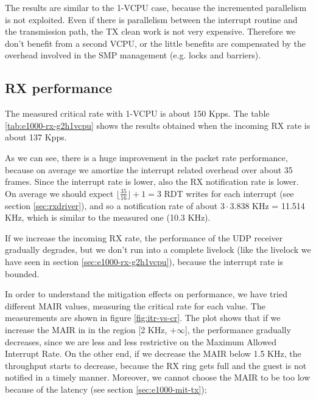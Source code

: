The results are similar to the 1-VCPU case, because the incremented parallelism is not exploited. Even if there is parallelism
between the interrupt routine and the transmission path, the TX clean work is not very expensive. Therefore we don't benefit from a second 
VCPU, or the little benefits are compensated by the overhead involved in the SMP management (e.g. locks and barriers).


\subsection{RX performance}
The measured critical rate with 1-VCPU is about 150 Kpps.
The table \ref{tab:e1000-rx-g2h1vcpu} shows the results obtained when the incoming RX rate is about 137 Kpps.

As we can see, there is a huge improvement in the packet rate performance, because on average we amortize the interrupt related overhead
over about 35 frames. Since the interrupt rate is lower, also the RX notification rate is lower. On average we should expect 
$\lfloor \frac{35}{16} \rfloor + 1 = 3$ RDT writes for each interrupt (see section \ref{sec:rxdriver}), and so a notification rate of 
about $3 \cdot 3.838$ KHz = 11.514 KHz, which is similar to the measured one (10.3 KHz).

If we increase the incoming RX rate, the performance of the UDP receiver gradually degrades, but we don't run into a complete livelock 
(like the livelock we have seen in section \ref{sec:e1000-rx-g2h1vcpu}), because the interrupt rate is bounded.

\vspace{0.5cm}

In order to understand the mitigation effects on performance, we have tried different MAIR values, measuring the critical rate for
each value. The measurements are shown in figure \ref{fig:itr-vs-cr}.
The plot shows that if we increase the MAIR in in the region [2 KHz, $+\infty$], the performance gradually decreases, since we are 
less and less restrictive on the Maximum Allowed Interrupt Rate.
On the other end, if we decrease the MAIR below 1.5 KHz, the throughput starts to decrease, because the RX ring gets full and the guest
is not notified in a timely manner.
Moreover, we cannot choose the MAIR to be too low because of the latency (see section \ref{sec:e1000-mit-tx});

